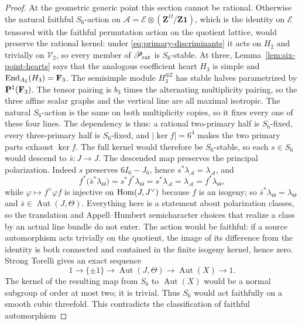 \begin{proof}
At the geometric generic point this section cannot be rational.  Otherwise
the natural faithful \(S_6\)-action on
\(\mathcal A=\mathcal E\otimes(\mathbf Z^\Omega/\mathbf Z\mathbf1)\), which
is the identity on \(\mathcal E\) tensored with the faithful permutation
action on the quotient lattice, would preserve the rational kernel: under
\eqref{eq:primary-discriminants} it acts on \(H_2\) and trivially on
\(\mathscr V_2\), so every member of
\(\mathscr P_{\rm rat}\) is \(S_6\)-stable.  At three, Lemma~\ref{lem:six-point-hearts} says that the analogous
coefficient heart \(H_3\) is simple and
\(\operatorname{End}_{A_5}(H_3)=\mathbf F_3\).  The semisimple module
\(H_3^{\oplus2}\) has stable halves parametrized by \(\mathbf P^1(\mathbf F_3)\).
The tensor pairing is \(b_3\) times the alternating multiplicity pairing, so
the three affine scalar graphs and the vertical line are all maximal
isotropic.  The natural \(S_6\)-action is the same on both multiplicity
copies, so it fixes every one of these four lines.  The dependency is thus:
a rational two-primary half is \(S_6\)-fixed, every three-primary half is
\(S_6\)-fixed, and \(|\ker f|=6^4\) makes the two primary parts exhaust
\(\ker f\).  The full kernel would therefore be \(S_6\)-stable, so each
\(s\in S_6\) would descend to \(\bar s:J\to J\).  The descended map preserves
the principal polarization.  Indeed \(s\) preserves \(6I_6-J_6\), hence
\(s^*\lambda_{\mathcal A}=\lambda_{\mathcal A}\), and
\[
 f^*\bigl(\bar s^*\lambda_\Theta\bigr)
 =s^*f^*\lambda_\Theta
 =s^*\lambda_{\mathcal A}
 =\lambda_{\mathcal A}
 =f^*\lambda_\Theta ,
\]
while \(\varphi\mapsto f^\vee\varphi f\) is injective on
\(\operatorname{Hom}(J,J^\vee)\) because \(f\) is an isogeny; so
\(\bar s^*\lambda_\Theta=\lambda_\Theta\) and
\(\bar s\in\operatorname{Aut}(J,\Theta)\).  Everything here is a statement
about polarization classes, so the translation and Appell--Humbert
semicharacter choices that realize a class by an actual line bundle do not
enter.  The action would be faithful: if a
source automorphism acts
trivially on the quotient, the image of its difference from the identity is
both connected and contained in the finite isogeny kernel, hence zero.
Strong Torelli gives an exact sequence \cite[Theorem~3.1]{Hartlieb}
\[
 1\longrightarrow\{\pm1\}\longrightarrow
 \operatorname{Aut}(J,\Theta)\longrightarrow
 \operatorname{Aut}(X)\longrightarrow1.
\]
The kernel of the resulting map from \(S_6\) to
\(\operatorname{Aut}(X)\) would be a normal subgroup of order at most two;
it is trivial.  Thus \(S_6\) would act faithfully on a smooth cubic
threefold.  This contradicts the classification of faithful automorphism

\end{proof}
